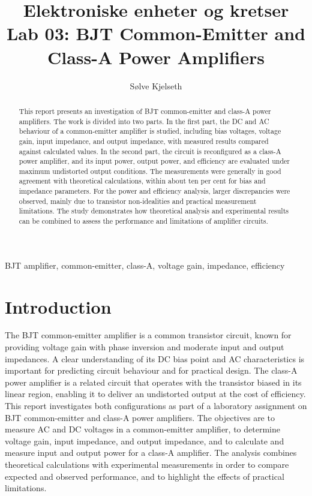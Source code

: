 \documentclass[conference]{IEEEtran}
\title{Elektroniske enheter og kretser\\
       Lab 03: BJT Common-Emitter and Class-A Power Amplifiers}
\author{Sølve Kjelseth}
\begin{document}
\maketitle


\begin{abstract}
This report presents an investigation of BJT common-emitter and class-A power amplifiers.
The work is divided into two parts.
In the first part, the DC and AC behaviour of a common-emitter amplifier is studied, including bias voltages, voltage gain, input impedance, and output impedance, with measured results compared against calculated values.
In the second part, the circuit is reconfigured as a class-A power amplifier, and its input power, output power, and efficiency are evaluated under maximum undistorted output conditions.
The measurements were generally in good agreement with theoretical calculations, within about ten per cent for bias and impedance parameters.
For the power and efficiency analysis, larger discrepancies were observed, mainly due to transistor non-idealities and practical measurement limitations.
The study demonstrates how theoretical analysis and experimental results can be combined to assess the performance and limitations of amplifier circuits.
\end{abstract}

\begin{IEEEkeywords}
BJT amplifier, common-emitter, class-A, voltage gain, impedance, efficiency
\end{IEEEkeywords}


\section{Introduction}
The BJT common-emitter amplifier is a common transistor circuit, known for providing voltage gain with phase inversion and moderate input and output impedances.
A clear understanding of its DC bias point and AC characteristics is important for predicting circuit behaviour and for practical design.
The class-A power amplifier is a related circuit that operates with the transistor biased in its linear region, enabling it to deliver an undistorted output at the cost of efficiency.
This report investigates both configurations as part of a laboratory assignment on BJT common-emitter and class-A power amplifiers.
The objectives are to measure AC and DC voltages in a common-emitter amplifier, to determine voltage gain, input impedance, and output impedance, and to calculate and measure input and output power for a class-A amplifier.
The analysis combines theoretical calculations with experimental measurements in order to compare expected and observed performance, and to highlight the effects of practical limitations.
\end{document}
